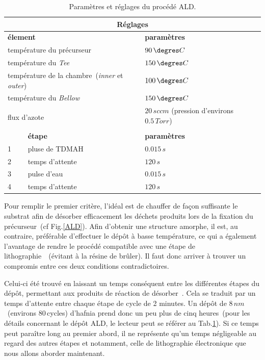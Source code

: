 \begin{table}
\begin{center}
\begin{tabular}{|p{0.5cm}|p{6cm}|p{6cm}|}
\hline
\multicolumn{3}{|c|}{\textbf{Réglages}} \tabularnewline
\hline
\multicolumn{2}{|l|}{\textbf{élement}} & \textbf{paramètres} \tabularnewline
\hline
\multicolumn{2}{|l|}{température du précurseur} & $90\, \degres C$ \tabularnewline
\hline
\multicolumn{2}{|l|}{température du \textit{Tee}} & $150\, \degres C$ \tabularnewline
\hline
\multicolumn{2}{|l|}{température de la chambre~(\textit{inner} et \textit{outer})} & $100\, \degres C$ \tabularnewline
\hline
\multicolumn{2}{|l|}{température du \textit{Bellow}} & $150\, \degres C$ \tabularnewline
\hline
\multicolumn{2}{|l|}{\multirow{2}{*}{flux d'azote}} & $20\, sccm$ \newline (pression d'environs $0.5\,Torr$) \tabularnewline
\hline
\hline
\multicolumn{3}{|c|}{\textbf{Procédé}} \tabularnewline
\hline
\,& \textbf{étape} & \textbf{paramètres} \tabularnewline
\hline
1 & pluse de TDMAH & $0.015\,s$ \tabularnewline
\hline
2 & temps d'attente & $120\,s$ \tabularnewline
\hline
3 & pulse d'eau & $0.015\,s$ \tabularnewline
\hline
4 & temps d'attente & $120\,s$ \tabularnewline
\hline
\end{tabular}
\caption{Paramètres et réglages du procédé ALD.}
\label{recette_ALD}
\end{center}
\end{table}



Pour remplir le premier critère, l'idéal est de chauffer de façon suffisante le substrat afin de désorber efficacement les déchets produits lors de la fixation du précurseur~(cf Fig.\ref{ALD}). Afin d'obtenir une structure amorphe, il est, au contraire, préférable d'effectuer le dép\^ot à basse température, ce qui a également l'avantage de rendre le procédé compatible avec une étape de lithographie~\cite{Biercuk2003}~(évitant à la résine de brûler). Il faut donc arriver à trouver un compromis entre ces deux conditions contradictoires.

Celui-ci été trouvé en laissant un temps conséquent entre les différentes étapes du dépôt, permettant aux produits de réaction de désorber~\cite{Biercuk2003}. Cela se traduit par un temps d'attente entre chaque étape de cycle de 2 minutes. Un dépôt de $8\,nm$~(environs 80\,cycles) d'hafnia prend donc un peu plus de cinq heures~(pour les détails concernant le dépôt ALD, le lecteur peut se référer au Tab.\ref{recette_ALD}). Si ce temps peut paraître long au premier abord, il ne représente qu'un temps négligeable au regard des autres étapes et notamment, celle de lithographie électronique que nous allons aborder maintenant.

